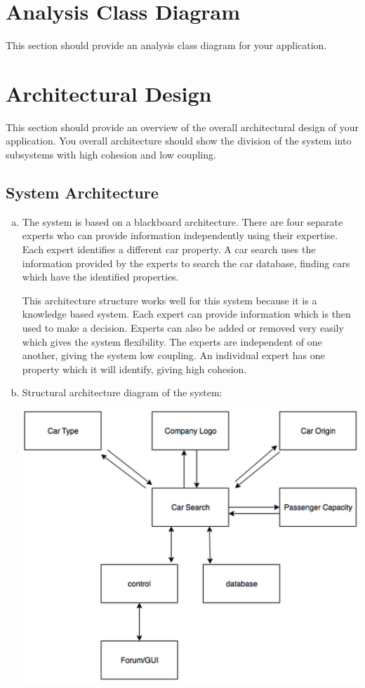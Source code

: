 \documentclass[12pt]{article}
\begin{document}
\section{Analysis Class Diagram}
\label{sec:analysis_class_diagram}
This section should provide an analysis class diagram for your application.


\section{Architectural Design}
\label{sec:architectural_design}
This section should provide an overview of the overall architectural design of your application. You overall architecture should show the division of the system into subsystems with high cohesion and low coupling.

\subsection{System Architecture}
\label{sub:system_architecture}
\begin{enumerate}[a)]
	\item The system is based on a blackboard architecture. There are four separate experts who can provide information independently using their expertise. Each expert identifies a different car property. A car search uses the information provided by the experts to search the car database, finding cars which have the identified properties.
	\par
	This architecture structure works well for this system because it is a knowledge based system. Each expert can provide information which is then used to make a decision. Experts can also be added or removed very easily which gives the system flexibility. The experts are independent of one another, giving the system low coupling. An individual expert has one property which it will identify, giving high cohesion.
	\item Structural architecture diagram of the system:
	\par
	\includegraphics[width=\textwidth]{Structural.png}
\end{enumerate}
\end{document}
